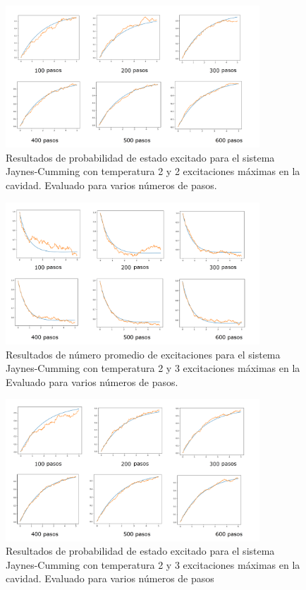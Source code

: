 \documentclass{book}
\begin{document}
\begin{figure}[ht]
    \includegraphics[width=0.85\textwidth]{test1_T2_pobe.png}
    \caption{Resultados de probabilidad de estado excitado para el sistema Jaynes-Cumming con temperatura 2 y 2 excitaciones máximas en la cavidad. Evaluado para varios números de pasos.}
\end{figure}

\begin{figure}[ht]
    \includegraphics[width=0.85\textwidth]{test2_T2_pob0.png}
    \caption{Resultados de número promedio de excitaciones para el sistema Jaynes-Cumming con temperatura 2 y 3 excitaciones máximas en la  Evaluado para varios números de pasos.}
\end{figure}

\begin{figure}[ht]
    \includegraphics[width=0.85\textwidth]{test2_T2_pobe.png}
    \caption{Resultados de probabilidad de estado excitado para el sistema Jaynes-Cumming con temperatura 2 y 3 excitaciones máximas en la cavidad. Evaluado para varios números de pasos }
\end{figure}
\end{document}
